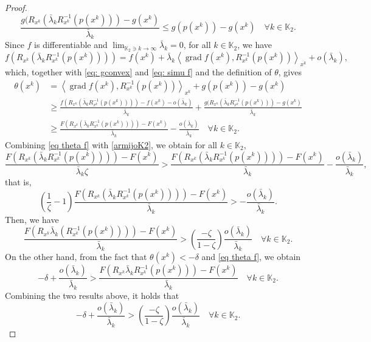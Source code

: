 \documentclass[pdflatex,sn-mathphys-num]{sn-jnl}%
\theoremstyle{definition} %
\theoremstyle{remark} %
\begin{document}
\begin{proof}
\begin{equation}
        \frac{g (R_{x^k}  (\bar{\lambda}_k R_{x^k}^{-1}(p (x^k)))-g (x^k)}{\bar{\lambda}_k} \leq g (p (x^k))-g (x^k) \quad \forall k \in \mathbb{K}_2.
        \end{equation}
        Since $f$ is differentiable and $\lim _{\mathbb{K}_2 \ni k \to \infty} \bar{\lambda}_k=0$, for all $k \in \mathbb{K}_2$, we have
        \begin{equation}\label{eq: simu f}
            f (R_{x^k}  (\bar{\lambda}_k R_{x^k}^{-1}(p (x^k)))) = f (x^k)+\bar{\lambda}_k\left\langle\operatorname{grad} f (x^k), R_{x^k}^{-1}(p (x^k))\right\rangle_{x^k} + o (\bar{\lambda}_k),
        \end{equation}
        which, together with \eqref{eq: gconvex} and
        \eqref{eq: simu f} and the definition of $\theta$, gives
        \begin{equation}\label{eq theta f}
        \begin{aligned}
        \theta (x^k) & = \left\langle\operatorname{grad} f (x^k), R_{x^k}^{-1}(p (x^k))\right\rangle_{x^k} +g (p (x^k))-g (x^k)\\
        & \geq \frac{f (R_{x^k}  (\bar{\lambda}_k R_{x^k}^{-1}(p (x^k)))) -f (x^k)- o (\bar{\lambda}_k)}{\bar{\lambda}_k} +\frac{g (R_{x^k}  (\bar{\lambda}_k R_{x^k}^{-1}(p (x^k)))-g (x^k)}{\bar{\lambda}_k}\\
        & \geq \frac{F (R_{x^k}  (\bar{\lambda}_kR_{x^k}^{-1}(p (x^k))))-F (x^k)}{\bar{\lambda}_k}-\frac{o (\bar{\lambda}_k)}{\bar{\lambda}_k} \quad \forall k \in \mathbb{K}_2 .
        \end{aligned}
        \end{equation}
        Combining \eqref{eq theta f} with \eqref{armijoK2}, we obtain for all  $k \in \mathbb{K}_2$,
        $$
        \frac{F (R_{x^k}  (\bar{\lambda}_kR_{x^k}^{-1}(p (x^k))))-F (x^k)}{\bar{\lambda}_k\zeta}
            > \frac{F (R_{x^k}  (\bar{\lambda}_kR_{x^k}^{-1}(p (x^k))))-F (x^k)}{\bar{\lambda}_k}-\frac{o (\bar{\lambda}_k)}{\bar{\lambda}_k},
            $$
        that is,
            $$
            \left(\frac{1}{\zeta} -1\right)\frac{F (R_{x^k}  (\bar{\lambda}_kR_{x^k}^{-1}(p (x^k))))-F (x^k)}{\bar{\lambda}_k}
            > -\frac{o (\bar{\lambda}_k)}{\bar{\lambda}_k}.
        $$
        Then, we have
        $$
        \frac{F(R_{x^k} \bar{\lambda}_k (R_{x^k}^{-1} (p(x^k))))-F(x^k)}{\bar{\lambda}_k}>\left(\frac{-\zeta}{1-\zeta}\right) \frac{o (\bar{\lambda}_k)}{\bar{\lambda}_k} \quad \forall k \in \mathbb{K}_2 .
        $$
        On the other hand, from the fact that $\theta (x^k)<-\delta$ and \eqref{eq theta f}, we obtain
        $$
        -\delta+\frac{o (\bar{\lambda}_k )}{\bar{\lambda}_k}>\frac{F(R_{x^k} \bar{\lambda}_k R_{x^k}^{-1} (p(x^k)))-F(x^k)}{\bar{\lambda}_k} \quad \forall k \in \mathbb{K}_2 .
        $$
        Combining the two results above, it holds that 
        $$
        -\delta+\frac{o(\bar{\lambda}_k)}{\bar{\lambda}_k}>\left(\frac{-\zeta}{1-\zeta}\right) \frac{o(\bar{\lambda}_k)}{\bar{\lambda}_k} \quad \forall k \in \mathbb{K}_2 .
        $$
        

\end{proof}
\end{document}

